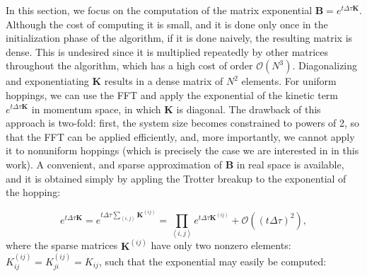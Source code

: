 In this section, we focus on the computation of the matrix exponential $\bm B = e^{t \Delta \tau \bm K}$.
Although the cost of computing it is small, and it is done only once in the initialization phase of the algorithm, if it is done naively, the resulting matrix is dense.
This is undesired since it is multiplied repeatedly by other matrices throughout the algorithm, which has a high cost of order $\mathcal{O}(N^3)$.
Diagonalizing and exponentiating $\bm K$ results in a dense matrix of $N^2$ elements.
For uniform hoppings, we can use the \ac{FFT} and apply the exponential of the kinetic term $e^{t \Delta \tau \bm K }$ in momentum space, in which $\bm K$ is diagonal.
The drawback of this approach is two-fold: first, the system size becomes constrained to powers of 2, so that the \ac{FFT} can be applied efficiently, and, more importantly, we cannot apply it to nonuniform hoppings (which is precisely the case we are interested in in this work).
A convenient, and sparse approximation of $\bm B$ in real space is available, and it is obtained simply by appling the Trotter breakup to the exponential of the hopping:

\begin{equation}
e^{t \Delta \tau \bm K } = e^{t \Delta \tau \sum_{\left\langle i, j \right\rangle} \bm K^{(ij)} } = \prod_{\left\langle i, j \right\rangle} e^{t \Delta \tau\bm K^{(ij)}} + \mathcal{O} ( (t \Delta \tau)^2 ) ,
\end{equation}
where the sparse matrices $\bm K^{(ij)}$ have only two nonzero elements: $K_{ij}^{(ij)} = K_{ji}^{(ij)} = K_{ij}$, such that the exponential may easily be computed:

